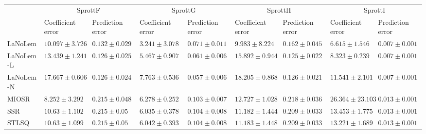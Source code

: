 \begin{table*}
{\begin{tabular}{lllllllll}
 & \multicolumn{2}{c}{SprottF} & \multicolumn{2}{c}{SprottG} & \multicolumn{2}{c}{SprottH} & \multicolumn{2}{c}{SprottI} \\
 & Coefficient error & Prediction error & Coefficient error & Prediction error & Coefficient error & Prediction error & Coefficient error & Prediction error \\
\midrule
LaNoLem & $10.097\pm 3.726$ & $0.132\pm 0.029$ & $\mathbf{3.241}\pm 3.078$ & $0.071\pm 0.011$ & $\mathbf{9.983}\pm 8.224$ & $0.162\pm 0.045$ & $\mathbf{6.615}\pm 1.546$ & $0.007\pm 0.001$ \\
LaNoLem-L & $13.439\pm 1.241$ & $0.126\pm 0.025$ & $5.467\pm 0.907$ & $0.061\pm 0.006$ & $15.892\pm 0.944$ & $\mathbf{0.125}\pm 0.022$ & $8.323\pm 0.239$ & $\mathbf{0.007}\pm 0.001$ \\
LaNoLem-N & $17.667\pm 0.606$ & $\mathbf{0.126}\pm 0.024$ & $7.763\pm 0.536$ & $\mathbf{0.057}\pm 0.006$ & $18.205\pm 0.868$ & $0.126\pm 0.021$ & $11.541\pm 2.101$ & $0.007\pm 0.001$ \\
MIOSR & $\mathbf{8.252}\pm 3.292$ & $0.215\pm 0.048$ & $6.278\pm 0.252$ & $0.103\pm 0.007$ & $12.727\pm 1.028$ & $0.218\pm 0.036$ & $26.364\pm 23.103$ & $0.013\pm 0.001$ \\
SSR & $10.63\pm 1.102$ & $0.215\pm 0.05$ & $6.035\pm 0.378$ & $0.104\pm 0.008$ & $11.182\pm 1.444$ & $0.209\pm 0.033$ & $13.453\pm 1.775$ & $0.013\pm 0.001$ \\
STLSQ & $10.63\pm 1.099$ & $0.215\pm 0.05$ & $6.042\pm 0.393$ & $0.104\pm 0.008$ & $11.183\pm 1.448$ & $0.209\pm 0.033$ & $13.221\pm 1.689$ & $0.013\pm 0.001$ \\

\midrule


\end{tabular}}
\end{table*}
